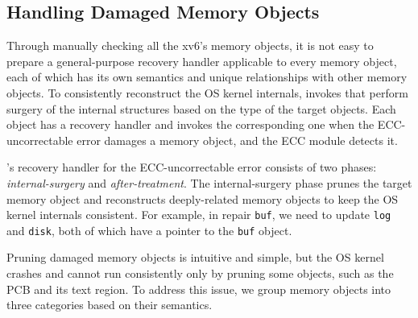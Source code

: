 \subsection{Handling Damaged Memory Objects}
\label{subsec:handling_objects}
Through manually checking all the xv6's memory objects, it is not easy to prepare a general-purpose recovery handler applicable to every memory object, each of which has its own semantics and unique relationships with other memory objects. To consistently reconstruct the OS kernel internals, {\sysname} invokes \emph{\rhs} that perform surgery of the internal structures based on the type of the target objects. Each object has a recovery handler and {\sysname} invokes the corresponding one when the ECC-uncorrectable error damages a memory object, and the ECC module detects it.

{\sysname}'s recovery handler for the ECC-uncorrectable error consists of two phases: \emph{internal-surgery} and \emph{after-treatment}. The internal-surgery phase prunes the target memory object and reconstructs deeply-related memory objects to keep the OS kernel internals consistent. For example, in repair \texttt{buf}, we need to update \texttt{log} and \texttt{disk}, both of which have a pointer to the \texttt{buf} object.

Pruning damaged memory objects is intuitive and simple, but the OS kernel crashes and cannot run consistently only by pruning some objects, such as the PCB and its text region. To address this issue, we group memory objects into three categories based on their semantics.

